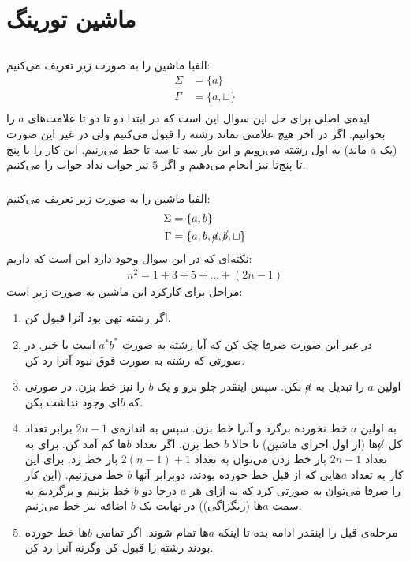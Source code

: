 \section{ماشین تورینگ}
\subsection{}
\subsubsection{}
الفبا ماشین را به صورت زیر تعریف می‌کنیم:
\begin{align*}
    \Sigma &= \{a\}\\
    \Gamma &= \{a, \sqcup\}\\
\end{align*}
ایده‌ی اصلی برای حل این سوال این است که در ابتدا دو تا دو تا علامت‌های
$a$
را بخوانیم. اگر در آخر هیچ علامتی نماند رشته را قبول می‌کنیم ولی در غیر این صورت
(یک $a$ ماند)
به اول رشته می‌رویم و این بار سه تا سه تا خط می‌زنیم. این کار را با پنج تا پنج‌تا نیز انجام می‌دهیم 
و اگر 5 نیز جواب نداد جواب را
می‌کنیم.
\subsubsection{}
الفبا ماشین را به صورت زیر تعریف می‌کنیم:
\begin{align*}
    \Sigma &= \{a, b\}\\
    \Gamma &= \{a, b, \cancel{a}, \cancel{b}, \sqcup\}\\
\end{align*}
نکته‌ای که در این سوال وجود دارد این است که داریم:
\begin{gather*}
    n^2 = 1 + 3 + 5 + \dots + (2n - 1)
\end{gather*}
مراحل برای کارکرد این ماشین به صورت زیر است:
\begin{enumerate}
    \item اگر رشته تهی بود آنرا قبول کن.
    \item در غیر این صورت صرفا چک کن که آیا رشته به صورت
    $a^*b^*$
    است یا خیر. در صورتی که رشته به صورت فوق نبود آنرا رد کن.
    \item اولین $a$ را تبدیل به $\cancel{a}$
    بکن. سپس اینقدر جلو برو و یک
    $b$ را نیز خط بزن. در صورتی که $b$ای وجود نداشت  بکن.
    \item به اولین $a$ خط نخورده برگرد و آنرا خط بزن. سپس به اندازه‌ی
    $2n-1$
    برابر تعداد کل
    $\cancel{a}$ها
    (از اول اجرای‌ ماشین)
    تا حالا
    $b$
    خط بزن. اگر تعداد
    $b$ها کم آمد
    کن. برای به تعداد
    $2n-1$
    بار خط زدن می‌توان به تعداد
    $2(n-1) + 1$
    بار خط زد. برای این کار به تعداد
    $a$هایی که از قبل خط خورده بودند، دوبرابر آنها
    $b$
    خط می‌زنیم.
    (این کار را صرفا می‌توان به صورتی کرد که به ازای هر $a$ درجا دو $b$ خط بزنیم و برگردیم به سمت $a$ها (زیگزاگی))
    در نهایت یک $b$ اضافه نیز خط می‌زنیم.
    \item مرحله‌ی قبل را اینقدر ادامه بده تا اینکه $a$ها تمام شوند.
    اگر تمامی
    $b$ها
    خط خورده بودند رشته را قبول کن وگرنه آنرا رد کن.
\end{enumerate}

